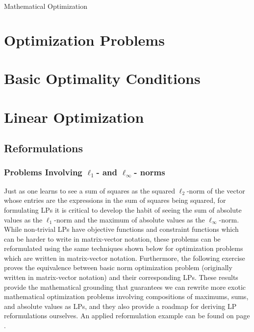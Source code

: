 \begin{chapter}{Mathematical Optimization}


    \section{Optimization Problems}


    \section{Basic Optimality Conditions}
    
    \section{Linear Optimization}

    \subsection{Reformulations}
    \label{subsubsec:lp-norm-reformulation}
    \subsubsection{Problems Involving $\ell_1$- and $\ell_\infty$- norms}
    Just as one learns to see a sum of squares as the squared $\ell_2$-norm of the vector whose entries are
    the expressions in the sum of squares being squared, for formulating LPs it is critical to develop
    the habit of seeing the sum of absolute values as the $\ell_1$-norm and the maximum of absolute
    values as the $\ell_{\infty}$-norm. While non-trivial LPs have objective functions and constraint functions
    which can be harder to write in matrix-vector notation, these problems can be reformulated using the same techniques
    shown below for optimization problems which are written in matrix-vector notation.
    Furthermore, the following exercise proves the equivalence between basic norm optimization problem
    (originally written in matrix-vector notation) and their corresponding LPs. 
    These results provide the mathematical grounding that guarantees we can rewrite more exotic
    mathematical optimization problems involving compositions of maximums, sums, and absolute values as LPs,
    and they also provide a roadmap for deriving LP reformulations ourselves. An applied reformulation example
    can be found on page \hyperref[rocket-lp-example]{\pageref{rocket-lp-example}}.
    

\end{chapter}
